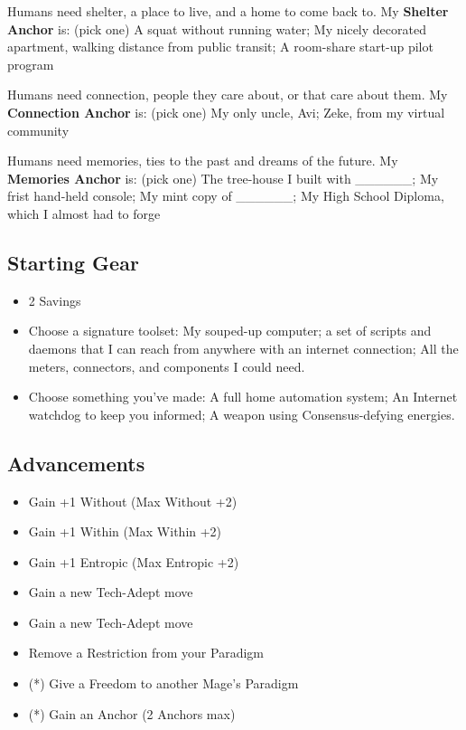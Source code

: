 \documentclass[
  oneside,
  statementpaper,
  9pt]{memoir}
\begin{document}
Humans need shelter, a place to live, and a home to come back to. My
\textbf{Shelter Anchor} is: (pick one) A squat without running water; My
nicely decorated apartment, walking distance from public transit; A
room-share start-up pilot program

Humans need connection, people they care about, or that care about them.
My \textbf{Connection Anchor} is: (pick one) My only uncle, Avi; Zeke,
from my virtual community

Humans need memories, ties to the past and dreams of the future. My
\textbf{Memories Anchor} is: (pick one) The tree-house I built with
\_\_\_\_\_\_; My frist hand-held console; My mint copy of \_\_\_\_\_\_;
My High School Diploma, which I almost had to forge

\hypertarget{starting-gear-6}{%
\subsection{Starting Gear}\label{starting-gear-6}}

\begin{itemize}
\tightlist
\item
  2 Savings
\item
  Choose a signature toolset: My souped-up computer; a set of scripts
  and daemons that I can reach from anywhere with an internet
  connection; All the meters, connectors, and components I could need.
\item
  Choose something you've made: A full home automation system; An
  Internet watchdog to keep you informed; A weapon using
  Consensus-defying energies.
\end{itemize}

\hypertarget{advancements-6}{%
\subsection{Advancements}\label{advancements-6}}

\begin{itemize}
\tightlist
\item
  Gain +1 Without (Max Without +2)
\item
  Gain +1 Within (Max Within +2)
\item
  Gain +1 Entropic (Max Entropic +2)
\item
  Gain a new Tech-Adept move
\item
  Gain a new Tech-Adept move
\item
  Remove a Restriction from your Paradigm
\item
  (*) Give a Freedom to another Mage's Paradigm
\item
  (*) Gain an Anchor (2 Anchors max)
\end{itemize}
\end{document}
